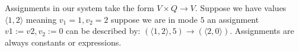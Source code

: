 Assignments in our system take the form $V \times Q \rightarrow V$. Suppose we have values $\langle 1,2 \rangle$ meaning $v_1 = 1, v_2 = 2$ suppose we are in mode $5$ an assignment $v1 := v2, v_2 := 0$ can be described by: $( \langle 1,2 \rangle,5) \rightarrow ( \langle 2,0 \rangle )$. Assignments are always constants or expressions.


%
%
%

%


